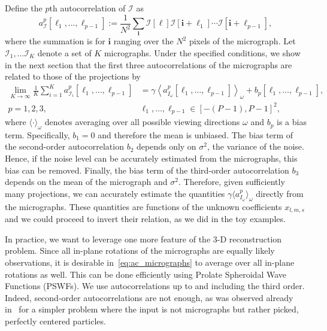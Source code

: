 \documentclass[12pt]{article}
\newcommand{\1}{\mathbf{1}}
\newcommand{\II}{\mathcal{I}}
\newcommand{\mb}{\mathbf}
\newcommand*\Bell{\ensuremath{\boldsymbol\ell}}
\newcommand{\tamir}{x}
\theoremstyle{plain}
\theoremstyle{definition}
\theoremstyle{remark}
\theoremstyle{plain}
\theoremstyle{remark}
\theoremstyle{plain}
\theoremstyle{plain}
\begin{document}
Define the $p$th autocorrelation of $\II$ as
\begin{equation*} \label{eq:Kth_autocorrelation}
a^p_\II[\Bell_1,\ldots, \Bell_{p-1}] := \frac{1}{N^2}\sum_{\mb i}\II[\Bell]\II[\mb i+\Bell_1]\cdots \II[\mb i+\Bell_{p-1}],
\end{equation*}
where the summation is for $\mb i $ ranging over the $N^2$  pixels of the micrograph. 
Let $\II_1,\ldots\II_K$ denote a set of $K$ micrographs. 
Under the specified conditions, we show in the next section that the first three autocorrelations  of the micrographs are related to those of the projections by 
\begin{align} \label{eq:ac_micrographs}
\lim_{K\to\infty}\frac{1}{K}\sum_{i=1}^Ka^p_{\II_i}[\Bell_1,\ldots,\Bell_{p-1}]  &= \gamma\left\langle a^p_{I_\omega}[\Bell_1,\ldots,\Bell_{p-1}]\right\rangle_{\omega} + b_p[\Bell_1,\ldots,\Bell_{p-1}], \\ p=1,2,3, \quad & \Bell_1,\ldots,\Bell_{p-1}\in[-(P-1),P-1]^2, \nonumber
\end{align}
where $\langle\cdot\rangle_\omega$ denotes averaging over all possible viewing directions $\omega$ and $b_p$ is a bias term. 
Specifically,  $b_1 = 0$ and therefore the mean is unbiased. The bias term of the second-order autocorrelation  $b_2$ depends only on $\sigma^2$, the variance of the noise. Hence, if the noise level can be accurately estimated from the micrographs, this bias can be removed. 
Finally, the bias term of the third-order autocorrelation $b_3$ depends on the mean of the micrograph and $\sigma^2$.  Therefore, given sufficiently many projections, we can accurately estimate the quantities $\gamma\langle a^p_{I_{\omega}}\rangle_{\omega}$ directly from the micrographs. These quantities are functions of the unknown coefficients $\tamir_{l,m,s}$ and we could proceed to invert their relation, as we did in the  toy examples. 

In practice, we want to leverage one more feature of the 3-D reconstruction problem.
Since all in-plane rotations of the micrographs are equally likely observations, 
it is desirable in~\eqref{eq:ac_micrographs} to average over all in-plane rotations as well.
This can be done efficiently using Prolate Spheroidal Wave Functions (PSWFs).  We use autocorrelations up to and including the  third order. Indeed, second-order autocorrelations are not enough, as was observed already in~\cite{kam1980reconstruction} for a simpler problem where the input is not micrographs but rather picked, perfectly centered particles. 
\end{document}
